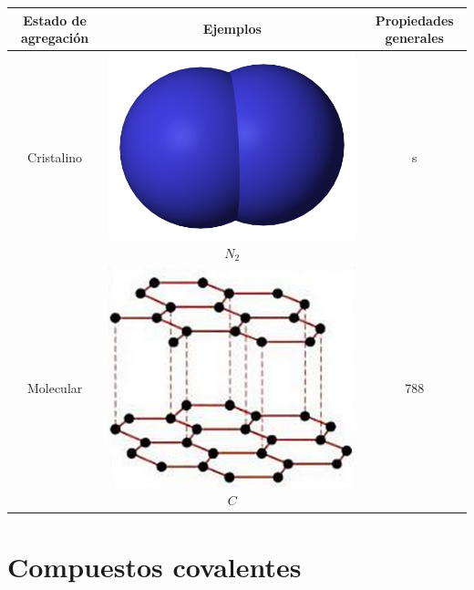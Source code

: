 \documentclass{book}
\begin{document}
\begin{tabular}{| c | c c |}
  \hline
  Estado de agregación & Ejemplos & Propiedades generales \\
  \hline
  Cristalino & \includegraphics[scale=0.05]{dinitrogeno.png} \textit{$ N_{2} $} & s \\
  \hline
  Molecular & \includegraphics[scale=0.20]{grafito.png} \textit{$ C $} & 788 \\
  \hline
\end{tabular}

\section{Compuestos covalentes}
\end{document}
